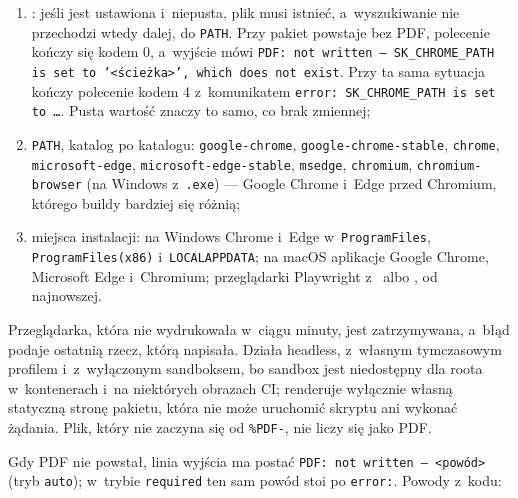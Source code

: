 \begin{enumerate}
  \item {}: jeśli jest ustawiona i~niepusta, plik musi istnieć,
        a~wyszukiwanie nie przechodzi wtedy dalej, do \texttt{PATH}. Przy
         pakiet powstaje bez PDF, polecenie kończy się kodem 0,
        a~wyjście mówi \texttt{PDF: not written — SK\_CHROME\_PATH is set to '<ścieżka>',
        which does not exist}. Przy  ta sama sytuacja kończy
        polecenie kodem 4 z~komunikatem \texttt{error: SK\_CHROME\_PATH is set to …}. Pusta
        wartość znaczy to samo, co brak zmiennej;
  \item \texttt{PATH}, katalog po katalogu: \texttt{google-chrome},
        \texttt{google-chrome-stable}, \texttt{chrome}, \texttt{microsoft-edge},
        \texttt{microsoft-edge-stable}, \texttt{msedge}, \texttt{chromium},
        \texttt{chromium-browser} (na Windows z~\texttt{.exe}) --- Google Chrome i~Edge przed
        Chromium, którego buildy bardziej się różnią;
  \item miejsca instalacji: na Windows Chrome i~Edge w~\texttt{ProgramFiles},
        \texttt{ProgramFiles(x86)} i~\texttt{LOCALAPPDATA}; na macOS aplikacje Google Chrome,
        Microsoft Edge i~Chromium; przeglądarki Playwright z~ albo , od najnowszej.
\end{enumerate}

Przeglądarka, która nie wydrukowała w~ciągu minuty, jest zatrzymywana, a~błąd podaje ostatnią
rzecz, którą napisała. Działa headless, z~własnym tymczasowym profilem i~z~wyłączonym
sandboksem, bo sandbox jest niedostępny dla roota w~kontenerach i~na niektórych obrazach CI;
renderuje wyłącznie własną statyczną stronę pakietu, która nie może uruchomić skryptu ani
wykonać żądania. Plik, który nie zaczyna się od \texttt{\%PDF-}, nie liczy się jako PDF.

Gdy PDF nie powstał, linia wyjścia ma postać \texttt{PDF: not written — <powód>} (tryb
\texttt{auto}); w~trybie \texttt{required} ten sam powód stoi po \texttt{error:}. Powody
z~kodu:

